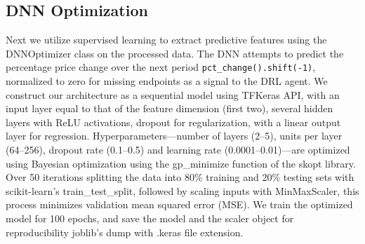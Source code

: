 \subsection{DNN Optimization}
Next we utilize supervised learning to extract predictive features using the DNNOptimizer class on the processed data. The DNN attempts to predict the percentage price change over the next period \texttt{pct\_change().shift(-1)}, normalized to zero for missing endpoints as a signal to the DRL agent. We construct our architecture as a sequential model using TFKeras API, with an input layer equal to that of the feature dimension (first two), several hidden layers with ReLU activations, dropout for regularization, with a linear output layer for regression. Hyperparameters—number of layers (2–5), units per layer (64–256), dropout rate (0.1–0.5) and learning rate (0.0001–0.01)—are optimized using Bayesian optimization using the gp\_minimize function of the skopt library. Over 50 iterations splitting the data into 80\% training and 20\% testing sets with scikit-learn’s train\_test\_split, followed by scaling inputs with MinMaxScaler, this process minimizes validation mean squared error (MSE). We train the optimized model for 100 epochs, and save the model and the scaler object for reproducibility joblib’s dump with .keras file extension.



